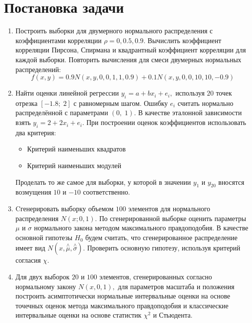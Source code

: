 \documentclass[a4]{article}
\renewcommand{\listoffigures}{\begingroup %
\tocsection
\tocfile{\listfigurename}{lof}
\endgroup}
\begin{document}
\newpage
\pagestyle{plain}




\newpage
\tableofcontents{}
\newpage
\listoffigures{}
\newpage

\section{Постановка задачи}
\begin{enumerate}
	\item Построить выборки для двумерного нормального распределения с коэффициентами корреляции $\rho = 0, 0.5, 0.9$. Вычислить коэффициент корреляции Пирсона, Спирмана и квадрантный коэффициент корреляции для каждой выборки. 
	Повторить вычисления для смеси двумерных нормальных распределений: 
	\begin{equation}
	    f(x,y) = 0.9N(x,y,0,0,1,1,0.9)+0.1N(x,y,0,0,10,10,-0.9)
	\end{equation}
	\item Найти оценки линейной регрессии $y_i=a+bx_i+e_i,$ используя $20$ точек отрезка $[-1.8;\;2]$ с равномерным шагом. Ошибку $e_i$ считать нормально распределённой с параметрами $(0,\;1).$ В качестве эталонной зависимости взять $y_i=2+2x_i+e_i.$ При построении оценок коэффициентов использовать два критерия: 
	\begin{itemize}
	\item Критерий наименьших квадратов 
	\item Критерий наименьших модулей
	\end{itemize}
	Проделать то же самое для выборки, у которой в значении $y_1$ и $y_{20}$ вносятся возмущения $10$ и $-10$ соответственно.
	\item Cгенерировать выборку объемом $100$ элементов для нормального распределения $N(x;0,1).$ По сгенерированной выборке оценить параметры $\mu$ и $\sigma$ нормального закона методом максимального правдоподобия. В качестве основной гипотезы $H_0$ будем считать, что сгенерированное распределение имеет вид $N(x,\overset{\wedge}{\mu},\overset{\wedge}{\sigma} ).$ Проверить основную гипотезу, используя критерий согласия $\chi$.
	\item Для двух выборок $20$ и $100$ элементов, сгенерированных согласно нормальному закону $N(x,0,1),$ для параметров масштаба и положения построить асимптотически нормальные интервальные оценки на основе точечных оценок метода максимального правдоподобия и классические интервальные оценки на основе статистик $\chi^2$ и Стьюдента.
	\end{enumerate}
\end{document}
